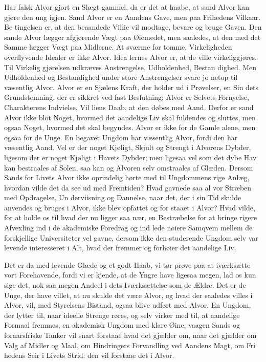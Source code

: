 \documentclass[12pt]{book}
\newcommand{\opage}[1]{\marginnote{\footnotesize\textit{[#1]}}}
\begin{document}
Har falsk Alvor gjort en Slægt gammel, da er det at
haabe, at sand Alvor kan gjøre den ung igjen. Sand Alvor
er en Aandens Gave, men paa Frihedens Vilkaar. Be\-%
tingelsen er, at den beaandede Villie vil modtage, bevare
\opage{15}\setcounter{footnote}{0}%
og bruge Gaven. Den sande Alvor lægger afgjørende
Vægt paa Øiemedet, men saaledes, at den med det Samme
lægger Vægt paa Midlerne. At sværme for tomme,
Virkeligheden overflyvende Idealer er ikke Alvor. Idea\-%
lernes Alvor er, at de ville virkeliggjøres. Til Virkelig\-%
gjørelsen udkræves Anstrengelse, Udholdenhed, Bestan\-%
dighed. Men Udholdenhed og Bestandighed under store
Anstrengelser svare jo netop til væsentlig Alvor. Alvor
er en Sjælens Kraft, der holder ud i Prøvelser, en Sin\-%
dets Grundstemning, der er sikkret ved fast Beslutning;
Alvor er Selvets Fornyelse, Charakterens Indvielse, Vil\-%
liens Daab, at den døbes med Aand. Derfor er sand
Alvor ikke blot Noget, hvormed det aandelige Liv skal
fuldendes og sluttes, men ogsaa Noget, hvormed det skal
begyndes. Alvor er ikke for de Gamle alene, men ogsaa
for de Unge. En begavet Ungdom har væsentlig Alvor,
fordi den har væsentlig Aand. Vel er der noget Kjøligt,
Skjult og Strengt i Alvorens Dybder, ligesom der er
noget Kjøligt i Havets Dybder; men ligesaa vel som det
dybe Hav kan bestraales af Solen, saa kan og Alvoren
selv omstraales af Glæden. Dersom Sands for Livets
Alvor ikke oprindelig hørte med til Ungdommens rige
Anlæg, hvordan vilde det da see ud med Fremtiden?
Hvad gavnede saa al vor Stræben med Opdragelse, Un\-%
derviisning og Dannelse, naar det, der i sin Tid skulde
anvendes og bruges i Alvor, ikke blev opfattet og for\-%
staaet i Alvor? Hvad vilde, for at holde os til hvad
der nu ligger saa nær, en Bestræbelse for at bringe
rigere Afvexling ind i de akademiske Foredrag og ind\-%
lede nøiere Samqvem mellem de forskjellige Universiteter
vel gavne, dersom ikke den studerende Ungdom selv var
levende interesseret i Alt, hvad der fremmer og forhøier
det aandelige Liv.

Det er da med levende Glæde og et godt Haab, vi tør
\opage{16}\setcounter{footnote}{0}%
prøve paa at iværksætte vort Forehavende, fordi vi er\-%
kjende, at de Yngre have ligesaa megen, lad os kun sige
det, nok saa megen Andeel i dets Iværksættelse som de
Ældre. Det er de Unge, der have villet, at nu skulde
det være Alvor, og hvad der saaledes villes i Alvor, vil,
med Styrelsens Bistand, ogsaa blive udført med Alvor.
En Ungdom, der lytter til, naar ideelle Strenge røres, og
selv virker med til, at aandelige Formaal fremmes, en
akademisk Ungdom med klare Øine, vaagen Sands og
foraarsfriske Tanker vil snart forstaae hvad det gjælder
om, naar det gjælder om Valg af Midler og Maal, om
Hindringers Forvandling ved Aandens Magt, om Fri\-%
hedens Seir i Livets Strid: den vil forstaae det i Alvor.
\end{document}
